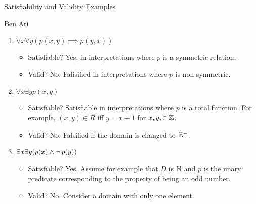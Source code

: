 \documentclass[style=sailor,size=12pt]{powerdot}
\begin{document}
\begin{wideslide}[bm=,toc=]{Satisfiability and Validity Examples}
\begin{defn}{7.25}{Ben Ari}
\end{defn}
\begin{enumerate}
\item<2-> $\forall x \forall y (p(x,y) \implies p(y,x))$
\begin{itemize}
\item<3-> Satisfiable? \pause[3] Yes, in interpretations where $p$ is a
symmetric relation.
\item<3-> Valid? \pause No. Falisified in interpretations where $p$ is
non-symmetric. 
\end{itemize}
\item<6-> $\forall x \exists y p(x,y)$
\begin{itemize}
\item<7-> Satisfiable? \pause[3] Satisfiable in interpretations where 
$p$ is a total function. For example, $(x,y) \in R$ iff $y = x + 1$
for $x,y, \in \mathbb{Z}$.
\item<7-> Valid? \pause No. Falsified if the domain is changed to $\mathbb{Z}^-$.  
\end{itemize}
\item<10-> $\exists x \exists y(p(x) \land \mathop{\neg} p (y))$
\begin{itemize}
\item<11-> Satisfiable? \pause[3] Yes. Assume for example that $D$ is $\mathbb{N}$ and
$p$ is the unary predicate corresponding to the property of being an
odd number.
\item<11-> Valid? \pause No. Consider a domain with only one element.
\end{itemize}
\end{enumerate}
\end{wideslide}
\end{document}
